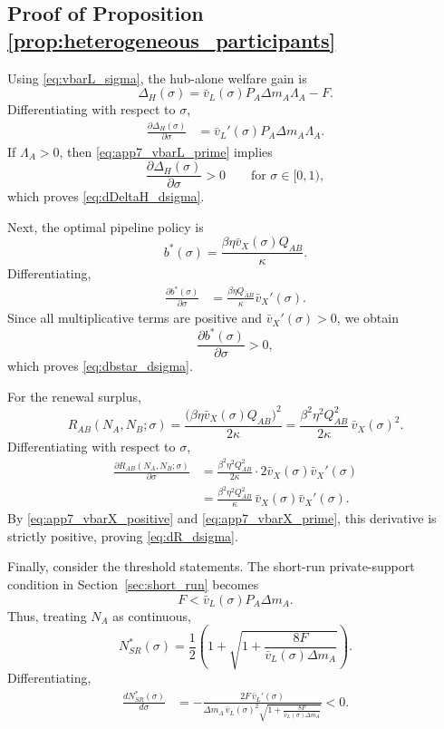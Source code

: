 \subsection{Proof of Proposition \ref{prop:heterogeneous_participants}}

Using \eqref{eq:vbarL_sigma}, the hub-alone welfare gain is
\[
\Delta_H(\sigma)
=
\bar v_L(\sigma)P_A\Delta m_A\Lambda_A-F.
\]
Differentiating with respect to $\sigma$,
\begin{align}
\frac{\partial \Delta_H(\sigma)}{\partial \sigma}
&=
\bar v_L'(\sigma)P_A\Delta m_A\Lambda_A.
\label{eq:app7_dDeltaH_dsigma_raw}
\end{align}
If $\Lambda_A>0$, then \eqref{eq:app7_vbarL_prime} implies
\[
\frac{\partial \Delta_H(\sigma)}{\partial \sigma}>0
\qquad
\text{for }\sigma\in[0,1),
\]
which proves \eqref{eq:dDeltaH_dsigma}.

Next, the optimal pipeline policy is
\[
b^*(\sigma)
=
\frac{\beta\eta \bar v_X(\sigma)Q_{AB}}{\kappa}.
\]
Differentiating,
\begin{align}
\frac{\partial b^*(\sigma)}{\partial \sigma}
&=
\frac{\beta\eta Q_{AB}}{\kappa}\bar v_X'(\sigma).
\label{eq:app7_dbstar_dsigma_raw}
\end{align}
Since all multiplicative terms are positive and $\bar v_X'(\sigma)>0$, we obtain
\[
\frac{\partial b^*(\sigma)}{\partial \sigma}>0,
\]
which proves \eqref{eq:dbstar_dsigma}.

For the renewal surplus,
\[
R_{AB}(N_A,N_B;\sigma)
=
\frac{\bigl(\beta\eta \bar v_X(\sigma)Q_{AB}\bigr)^2}{2\kappa}
=
\frac{\beta^2\eta^2Q_{AB}^2}{2\kappa}\,\bar v_X(\sigma)^2.
\]
Differentiating with respect to $\sigma$,
\begin{align}
\frac{\partial R_{AB}(N_A,N_B;\sigma)}{\partial \sigma}
&=
\frac{\beta^2\eta^2Q_{AB}^2}{2\kappa}\cdot 2\bar v_X(\sigma)\bar v_X'(\sigma)
\nonumber\\
&=
\frac{\beta^2\eta^2Q_{AB}^2}{\kappa}\,\bar v_X(\sigma)\bar v_X'(\sigma).
\label{eq:app7_dR_dsigma_raw}
\end{align}
By \eqref{eq:app7_vbarX_positive} and \eqref{eq:app7_vbarX_prime}, this derivative is strictly positive, proving \eqref{eq:dR_dsigma}.

Finally, consider the threshold statements. The short-run private-support condition in Section~\ref{sec:short_run} becomes
\[
F<\bar v_L(\sigma)P_A\Delta m_A.
\]
Thus, treating $N_A$ as continuous,
\begin{equation}
N_{SR}^*(\sigma)
=
\frac{1}{2}
\left(
1+\sqrt{1+\frac{8F}{\bar v_L(\sigma)\Delta m_A}}
\right).
\label{eq:app7_NSR_sigma}
\end{equation}
Differentiating,
\begin{align}
\frac{dN_{SR}^*(\sigma)}{d\sigma}
&=
-\frac{2F\,\bar v_L'(\sigma)}
{\Delta m_A\,\bar v_L(\sigma)^2
\sqrt{1+\frac{8F}{\bar v_L(\sigma)\Delta m_A}}}
<0.
\label{eq:app7_dNSR_dsigma}
\end{align}

